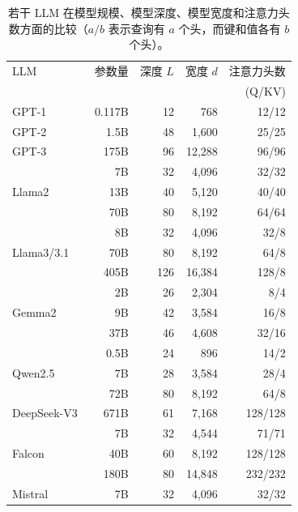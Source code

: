 \begin{table}[t]
\centering
\begingroup
\renewcommand{\arraystretch}{1.2}
\begin{tabular}{l | r | r | r | r }
LLM & 参数量 & 深度 $L$ & 宽度 $d$ & 注意力头数 \\
    &                  &           &           &   (Q/KV)    \\ \hline
GPT-1~\cite{radford-etal:2018improving} & 0.117B & 12 & 768 & 12/12 \\
GPT-2~\cite{radford-etal:2019language} & 1.5B & 48 & 1,600 & 25/25 \\
GPT-3~\cite{brown-etal:2020language} & 175B & 96 & 12,288 & 96/96 \\ \hline
\multirow{3}{*}{Llama2~\cite{touvron-etal:2023llama2}}
                       &  7B & 32 & 4,096 & 32/32 \\
                       &  13B & 40 & 5,120 & 40/40 \\
                       &  70B & 80 & 8,192 & 64/64 \\ \hline
\multirow{3}{*}{Llama3/3.1~\cite{dubey2024llama}}
                       &  8B & 32 & 4,096 & 32/8 \\
                       &  70B & 80 & 8,192 & 64/8 \\
                       &  405B & 126 & 16,384 & 128/8 \\ \hline
\multirow{3}{*}{Gemma2~\cite{team2024gemma}}
                       &  2B & 26 & 2,304 & 8/4 \\
                       &  9B & 42 & 3,584 & 16/8 \\
                       &  37B & 46 & 4,608 & 32/16 \\ \hline
\multirow{3}{*}{Qwen2.5~\cite{yang2024qwen2}}
                       &  0.5B & 24 & 896 & 14/2 \\
                       &  7B & 28 & 3,584 & 28/4 \\
                       &  72B & 80 & 8,192 & 64/8 \\ \hline
\multirow{1}{*}{DeepSeek-V3~\cite{liu2024deepseek}}
                       &  671B & 61 & 7,168 & 128/128 \\ \hline
\multirow{3}{*}{Falcon~\cite{penedo-etal:2023refinedweb}}
                       &  7B & 32 & 4,544 & 71/71 \\
                       &  40B & 60 & 8,192 & 128/128 \\
                       &  180B & 80 & 14,848 & 232/232 \\ \hline
Mistral~\cite{jiang-etal:2023mistral} & 7B & 32 & 4,096 & 32/32
\end{tabular}
\endgroup
\caption{若干 LLM 在模型规模、模型深度、模型宽度和注意力头数方面的比较（$a/b$ 表示查询有 $a$ 个头，而键和值各有 $b$ 个头）。}
\label{tab:llm-model-size-comparison}
\end{table}

